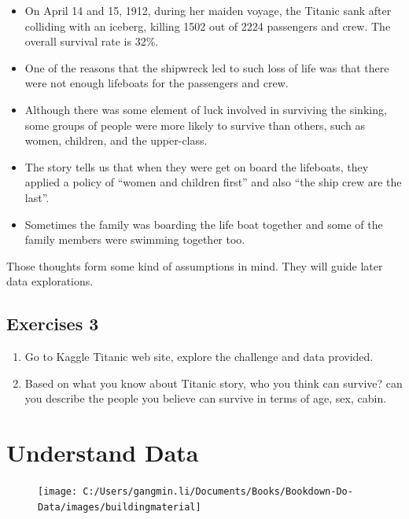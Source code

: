 \documentclass[
]{book}
\providecommand{\tightlist}{%
  \setlength{\itemsep}{0pt}\setlength{\parskip}{0pt}}
\begin{document}
\begin{itemize}
\tightlist
\item
  On April 14 and 15, 1912, during her maiden voyage, the Titanic sank after colliding with an iceberg, killing 1502 out of 2224 passengers and crew. The overall survival rate is 32\%.
\item
  One of the reasons that the shipwreck led to such loss of life was that there were not enough lifeboats for the passengers and crew.
\item
  Although there was some element of luck involved in surviving the sinking, some groups of people were more likely to survive than others, such as women, children, and the upper-class.
\item
  The story tells us that when they were get on board the lifeboats, they applied a policy of ``women and children first'' and also ``the ship crew are the last''.
\item
  Sometimes the family was boarding the life boat together and some of the family members were swimming together too.
\end{itemize}

Those thoughts form some kind of assumptions in mind. They will guide later data explorations.

\hypertarget{exercises-3}{%
\section*{Exercises 3}\label{exercises-3}}


\begin{enumerate}
\def\labelenumi{\arabic{enumi}.}
\tightlist
\item
  Go to Kaggle Titanic web site, explore the challenge and data provided.
\item
  Based on what you know about Titanic story, who you think can survive? can you describe the people you believe can survive in terms of age, sex, cabin.
\end{enumerate}

\hypertarget{understand-data}{%
\chapter{Understand Data}\label{understand-data}}

\begin{figure}

{\centering \texttt{[image: C:/Users/gangmin.li/Documents/Books/Bookdown-Do-Data/images/buildingmaterial]} 

}

\end{figure}
\end{document}

